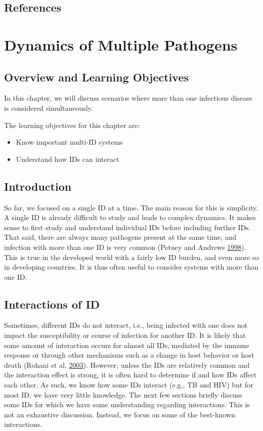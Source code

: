 \documentclass[]{book}
\providecommand{\tightlist}{%
  \setlength{\itemsep}{0pt}\setlength{\parskip}{0pt}}
\theoremstyle{definition}
\theoremstyle{definition}
\theoremstyle{definition}
\theoremstyle{remark}
\begin{document}
\section{References}\label{references-11}

\chapter{Dynamics of Multiple
Pathogens}\label{dynamics-of-multiple-pathogens}

\section{Overview and Learning
Objectives}\label{overview-and-learning-objectives-11}

In this chapter, we will discuss scenarios where more than one
infectious disease is considered simultaneously.

The learning objectives for this chapter are:

\begin{itemize}
\tightlist
\item
  Know important multi-ID systems
\item
  Understand how IDs can interact
\end{itemize}

\section{Introduction}\label{introduction-11}

So far, we focused on a single ID at a time. The main reason for this is
simplicity. A single ID is already difficult to study and leads to
complex dynamics. It makes sense to first study and understand
individual IDs before including further IDs. That said, there are always
many pathogens present at the same time, and infection with more than
one ID is very common (Petney and Andrews
\protect\hyperlink{ref-petney98}{1998}). This is true in the developed
world with a fairly low ID burden, and even more so in developing
countries. It is thus often useful to consider systems with more than
one ID.

\section{Interactions of ID}\label{interactions-of-id}

Sometimes, different IDs do not interact, i.e., being infected with one
does not impact the susceptibility or course of infection for another
ID. It is likely that some amount of interaction occurs for almost all
IDs, mediated by the immune response or through other mechanisms such as
a change in host behavior or host death (Rohani et al.
\protect\hyperlink{ref-rohani03}{2003}). However, unless the IDs are
relatively common and the interaction effect is strong, it is often hard
to determine if and how IDs affect each other. As such, we know how some
IDs interact (e.g., TB and HIV) but for most ID, we have very little
knowledge. The next few sections briefly discuss some IDs for which we
have some understanding regarding interactions. This is not an
exhaustive discussion. Instead, we focus on some of the best-known
interactions.
\end{document}
